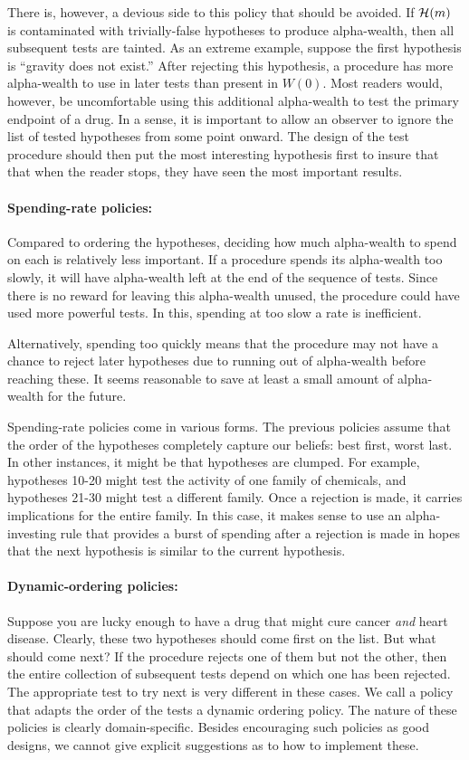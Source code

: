 \documentclass[12pt]{article}
\begin{document}
 There is, however, a devious side to this policy that should be avoided. If ${\cal H}(m)$ is contaminated with trivially-false hypotheses to produce alpha-wealth, then all subsequent tests are tainted.  As an extreme example, suppose the first hypothesis is ``gravity does not exist.''  After rejecting this
 hypothesis, a procedure has more alpha-wealth to use in later tests than present in $W(0)$.  Most readers would, however, be uncomfortable using this additional alpha-wealth to test the primary endpoint of a drug.  In a sense, it is important to allow
an observer to ignore the list of tested hypotheses from some point onward. The design of the test procedure should then put the most interesting hypothesis first to insure that that when the reader stops, they have seen the most important results.  

\paragraph{Spending-rate policies:} Compared to ordering the hypotheses,
 deciding how much alpha-wealth to spend on each is relatively less important.  If
 a procedure spends its alpha-wealth too slowly, it will have alpha-wealth left at the end of the sequence of tests.  Since there is no
 reward  for leaving this alpha-wealth unused, the procedure could have used more powerful tests.  In this, spending at too slow a rate is inefficient.

Alternatively, spending too quickly means that the procedure may not have a chance to reject later hypotheses due to running out of
 alpha-wealth before reaching these.  It seems reasonable to save at
 least a small amount of alpha-wealth for the future.  

Spending-rate policies come in various forms.  The previous policies assume that the order of the hypotheses completely capture our beliefs: best first, worst last.   In other instances, it might be that hypotheses are clumped.  For example, hypotheses 10-20 might test the activity of one family of chemicals, and hypotheses 21-30 might test a different family. Once a rejection is made, it carries implications for the entire family.  In this case, it makes sense to use an alpha-investing rule that provides a burst of spending after a rejection is made in hopes that the next hypothesis is similar to the current hypothesis.   

\paragraph{Dynamic-ordering policies:} Suppose you are lucky enough to have a
 drug that might cure cancer {\em and} heart disease.  Clearly, these two
 hypotheses should come first on the list.  But what should come next?
  If the procedure rejects one of them but not the other, then the entire collection of subsequent tests depend on which one has been rejected.  The appropriate
 test to try next is very different in these cases.  We call a policy that adapts the order of the tests a dynamic ordering policy.  The nature of these policies is clearly domain-specific.  Besides encouraging such policies as good designs, we cannot give explicit suggestions as to how to implement these.
\end{document}
